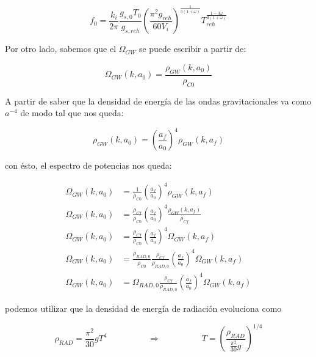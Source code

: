 \begin{equation}
    f_0 = \frac{k_i}{2 \pi} \frac{g_{s,0} T_0}{g_{s,reh}} \left( \frac{\pi^2 g_{reh}}{60 V_{i}} \right)^{\frac{1}{3(1 + \omega)}} T^{\frac{1 - 3 \omega}{3 (1 + \omega)}}_{reh}
\end{equation}

Por otro lado, sabemos que el $\Omega_{GW}$ se puede escribir a partir de:

\begin{equation}
    \Omega_{GW} (k, a_0) = \frac{\rho_{GW} (k, a_0)}{\rho_{C0}}
\end{equation}

\noindent
A partir de saber que la densidad de energía de las ondas gravitacionales va como $a^{-4}$ de modo tal que nos queda:

\begin{equation*}
    \rho_{GW} (k, a_0) = \left( \frac{a_f}{a_0} \right)^{4} \rho_{GW} (k, a_f)
\end{equation*}

\noindent
con ésto, el espectro de potencias nos queda:

\begin{equation*}
    \begin{split}
        \Omega_{GW} (k, a_0) &= \frac{1}{\rho_{C0}} \left( \frac{a_f}{a_0} \right)^4 \rho_{GW} \left( k, a_f \right)\\
        \Omega_{GW} (k, a_0) &= \frac{\rho_{Cf}}{\rho_{C0}} \left( \frac{a_f}{a_0} \right)^4 \frac{\rho_{GW} \left( k, a_f \right)}{\rho_{Cf}}\\
        \Omega_{GW} (k, a_0) &= \frac{\rho_{Cf}}{\rho_{C0}} \left( \frac{a_f}{a_0} \right)^4 \Omega_{GW} \left( k, a_f \right)\\
        \Omega_{GW} (k, a_0) &= \frac{\rho_{RAD,0}}{\rho_{C0}} \frac{\rho_{Cf}}{\rho_{RAD,0}} \left( \frac{a_f}{a_0} \right)^4 \Omega_{GW} \left( k, a_f \right)\\
        \Omega_{GW} (k, a_0) &= \Omega_{RAD,0} \frac{\rho_{Cf}}{\rho_{RAD,0}} \left( \frac{a_f}{a_0} \right)^4 \Omega_{GW} \left( k, a_f \right)
    \end{split}
\end{equation*}

\noindent
podemos utilizar que la densidad de energía de radiación evoluciona como

\begin{equation}
    \rho_{RAD} = \frac{\pi^2}{30} g T^4 \hspace{2cm} \Longrightarrow \hspace{2cm} T = \left( \frac{\rho_{RAD}}{\frac{\pi^2}{30} g} \right)^{1/4} 
\end{equation}

